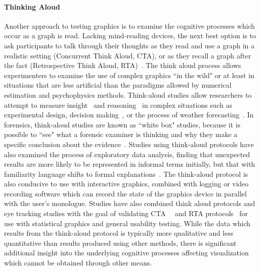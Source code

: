 \documentclass[letterpaper]{ar-1col}\usepackage[]{graphicx}\usepackage[]{color}
\begin{document}
\paragraph{Thinking Aloud} %
Another approach to testing graphics is to examine the cognitive processes which occur as a graph is read. Lacking mind-reading devices, the next best option is to ask participants to talk through their thoughts as they read and use a graph in a realistic setting (Concurrent Think Aloud, CTA), or as they recall a graph after the fact (Retrospective Think Aloud, RTA)~\citep{guan_validity_2006}. The think aloud process allows experimenters to examine the use of complex graphics ``in the wild" or at least in situations that are less artificial than the paradigms allowed by numerical estimation and psychophysics methods. Think-aloud studies allow researchers to attempt to measure insight~\citep{northMeasuringVisualizationInsight2006} and reasoning~\citep{dunbar1995scientists} in complex situations such as experimental design, decision making~\citep{normandEffectsCelerationLines2006}, or the process of weather forecasting~\citep{traftonTurningPicturesNumbers2000,kirschenbaum2003comparative}. In forensics, think-aloud studies are known as ``white box" studies, because it is possible to ``see" what a forensic examiner is thinking and why they make a specific conclusion about the evidence~\citep{Ulery7733}. Studies using think-aloud protocols have also examined the process of exploratory data analysis, finding that unexpected results are more likely to be represented in informal terms initially, but that with familiarity language shifts to formal explanations~\citep{trickettDipsyDoodlesStreamingMotions2000,trickett2000blobs}. The think-aloud protocol is also conducive to use with interactive graphics, combined with logging or video recording software which can record the state of the graphics device in parallel with the user's monologue. Studies have also combined think aloud protocols and eye tracking studies with the goal of validating CTA~~\citep{cookeAssessingConcurrentThinkAloud2010} and RTA protocols~\citep{guan_validity_2006} for use with statistical graphics and general usability testing. While the data which results from the think-aloud protocol is typically more qualitative and less quantitative than results produced using other methods, there is significant additional insight into the underlying cognitive processes  affecting visualization which cannot be obtained through other means.
\end{document}
